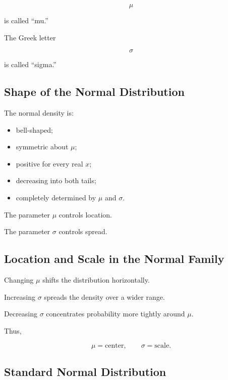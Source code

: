 \[
\mu
\]

is called ``mu.''

The Greek letter

\[
\sigma
\]

is called ``sigma.''

\subsection{Shape of the Normal Distribution}
\label{subsec:normal-shape}

The normal density is:

\begin{itemize}
    \item bell-shaped;
    \item symmetric about \(\mu\);
    \item positive for every real \(x\);
    \item decreasing into both tails;
    \item completely determined by \(\mu\) and \(\sigma\).
\end{itemize}

The parameter \(\mu\) controls location.

The parameter \(\sigma\) controls spread.

\subsection{Location and Scale in the Normal Family}
\label{subsec:normal-location-scale}

Changing \(\mu\) shifts the distribution horizontally.

Increasing \(\sigma\) spreads the density over a wider range.

Decreasing \(\sigma\) concentrates probability more tightly around
\(\mu\).

Thus,

\[
\boxed{
\mu
=
\text{center},
\qquad
\sigma
=
\text{scale}.
}
\]

\subsection{Standard Normal Distribution}
\label{subsec:standard-normal-distribution}

